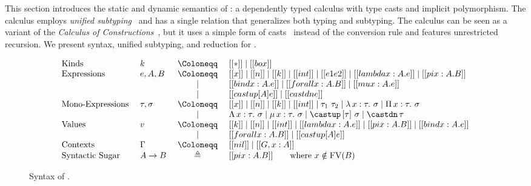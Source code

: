 \section{\System}
\label{sec:system}

This section introduces the static and dynamic semantics of
\name: a dependently typed calculus with type casts
and implicit polymorphism. The calculus employs
\emph{unified subtyping}~\cite{CoquandThierry1988Tcoc}
and has a single relation that generalizes both typing and subtyping.
The calculus can be seen as a variant of the \emph{Calculus of Constructions}~\cite{coc},
but it uses a simple form of casts~\cite{isotype,yang2019pure} instead of the
conversion rule and features unrestricted recursion.
We present syntax, unified subtyping, and reduction for \name.

\begin{figure}[t]
\centering
\begin{equation*}
\begin{array}{llcl}
    \text{Kinds} & k & ~\Coloneqq ~ & [[*]] \mid [[box]] \\
    \text{Expressions} & e, A, B & ~ \Coloneqq ~ & [[x]] \mid [[n]] \mid [[k]] \mid [[int]] \mid [[e1 e2]] \mid [[lambda x : A. e]] \mid [[pi x : A. B]] \\
        & & \mid & [[bind x : A. e]] \mid [[forall x : A. B]] \mid [[mu x : A. e]] \\
        & & \mid & [[castup [A] e]] \mid [[castdn e]]   \\
    \text{Mono-Expressions} ~ & \tau, \sigma & ~ \Coloneqq ~ & [[x]] \mid [[n]] \mid [[k]] \mid [[int]] \mid \tau_1 ~ \tau_2 \mid \lambda \, x : \tau. ~ \sigma \mid \Pi \, x : \tau. ~ \sigma \\
        & & \mid & \Lambda \, x : \tau. ~ \sigma \mid \mu \, x : \tau. ~ \sigma \mid \castup \, [\tau]~ \sigma \mid \castdn \, \tau \\
    \text{Values} & v & ~ \Coloneqq ~ & [[k]] \mid [[n]] \mid [[int]] \mid [[lambda x : A. e]] \mid [[pi x : A. B]] \mid [[bind x : A. e]] \\
        & & \mid & [[forall x : A. B]] \mid [[castup [A] e]] \\
    \text{Contexts} & \Gamma & ~ \Coloneqq ~ & [[nil]] \mid [[G , x : A]] \\
    \text{Syntactic Sugar} ~ & A \rightarrow B & \triangleq & [[pi x : A. B]] \qquad \text{where} ~ x \notin \mathrm{FV}(B)
\end{array}
\end{equation*}
\caption{Syntax of \name.}
\label{fig:syntax}
\end{figure}
